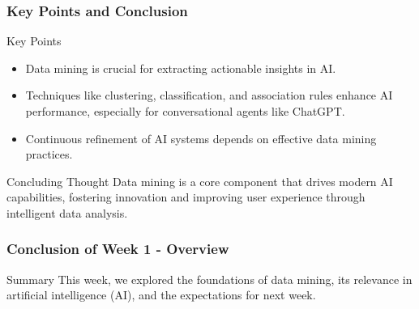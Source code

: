 \documentclass[aspectratio=169]{beamer}
\begin{document}
\begin{frame}[fragile]
    \frametitle{Key Points and Conclusion}
    \begin{block}{Key Points}
        \begin{itemize}
            \item Data mining is crucial for extracting actionable insights in AI.
            \item Techniques like clustering, classification, and association rules enhance AI performance, especially for conversational agents like ChatGPT.
            \item Continuous refinement of AI systems depends on effective data mining practices.
        \end{itemize}
    \end{block}
    
    \begin{block}{Concluding Thought}
        Data mining is a core component that drives modern AI capabilities, fostering innovation and improving user experience through intelligent data analysis.
    \end{block}
\end{frame}

\begin{frame}[fragile]
  \frametitle{Conclusion of Week 1 - Overview}
  \begin{block}{Summary}
    This week, we explored the foundations of data mining, its relevance in artificial intelligence (AI), and the expectations for next week.
  \end{block}
\end{frame}
\end{document}
